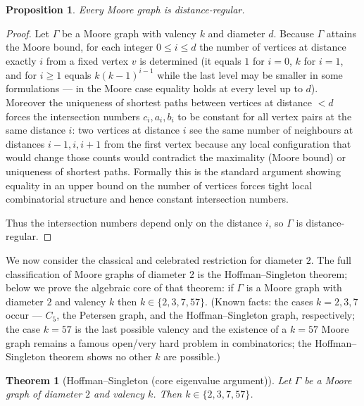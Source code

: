 \documentclass[12pt,a4paper,openany]{book}
\newtheorem{theorem}{Theorem}[section]
\newtheorem{proposition}{Proposition}[section]
\begin{document}
\begin{proposition}
Every Moore graph is distance-regular.
\end{proposition}

\begin{proof}
Let \(\Gamma\) be a Moore graph with valency \(k\) and diameter \(d\).
Because \(\Gamma\) attains the Moore bound, for each integer
\(0\le i\le d\) the number of vertices at distance exactly \(i\) from a
fixed vertex \(v\) is determined (it equals \(1\) for \(i=0\), \(k\)
for \(i=1\), and for \(i\ge1\) equals \(k(k-1)^{i-1}\) while the last
level may be smaller in some formulations — in the Moore case equality
holds at every level up to \(d\)).  Moreover the uniqueness of shortest
paths between vertices at distance \(<d\) forces the intersection
numbers \(c_i,a_i,b_i\) to be constant for all vertex pairs at the same
distance \(i\): two vertices at distance \(i\) see the same number of
neighbours at distances \(i-1,i,i+1\) from the first vertex because any
local configuration that would change those counts would contradict the
maximality (Moore bound) or uniqueness of shortest paths. Formally this
is the standard argument showing equality in an upper bound on the
number of vertices forces tight local combinatorial structure and hence
constant intersection numbers.

Thus the intersection numbers depend only on the distance \(i\), so
\(\Gamma\) is distance-regular.
\end{proof}

\bigskip
We now consider the classical and celebrated restriction for diameter
\(2\). The full classification of Moore graphs of diameter \(2\) is the
Hoffman–Singleton theorem; below we prove the algebraic core of that
theorem: if \(\Gamma\) is a Moore graph with diameter \(2\) and valency
\(k\) then \(k\in\{2,3,7,57\}\). (Known facts: the cases \(k=2,3,7\)
occur — \(C_5\), the Petersen graph, and the Hoffman–Singleton graph,
respectively; the case \(k=57\) is the last possible valency and the
existence of a \(k=57\) Moore graph remains a famous open/very hard
problem in combinatorics; the Hoffman–Singleton theorem shows no other
\(k\) are possible.)

\begin{theorem}[Hoffman--Singleton (core eigenvalue argument)]
Let \(\Gamma\) be a Moore graph of diameter \(2\) and valency \(k\).
Then \(k\in\{2,3,7,57\}\).
\end{theorem}
\end{document}

